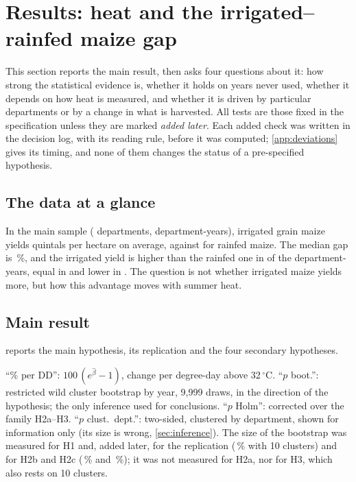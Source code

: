 \section{Results: heat and the irrigated--rainfed maize gap}
\label{sec:maize}

This section reports the main result, then asks four questions about it: how strong the statistical evidence is, whether it holds on years never used, whether it depends on how heat is measured, and whether it is driven by particular departments or by a change in what is harvested. All tests are those fixed in the specification unless they are marked \emph{added later}. Each added check was written in the decision log, with its reading rule, before it was computed; \cref{app:deviations} gives its timing, and none of them changes the status of a pre-specified hypothesis.

\subsection{The data at a glance}

In the main sample (\MaizeMainDeps{} departments, \MaizeMainPairs{} department-years), irrigated grain maize yields \YieldIrr{} quintals per hectare on average, against \YieldRain{} for rainfed maize. The median gap is \GapMedianPct\,\%, and the irrigated yield is higher than the rainfed one in \GapAboveCount{} of the \MaizeMainPairs{} department-years, equal in \GapEqualCount{} and lower in \GapBelowCount. The question is not whether irrigated maize yields more, but how this advantage moves with summer heat.

\subsection{Main result}
\label{subsec:maize-main}

 reports the main hypothesis, its replication and the four secondary hypotheses.

\begin{table}[H]
\centering
\small
\caption{Maize: main and secondary hypotheses (July--August, maize mask)}
\label{tab:maize-hyp}
\begin{threeparttable}
{\setlength{\tabcolsep}{3.5pt}}
\begin{tablenotes}\footnotesize
\item ``\% per DD'': $100\,(e^{\hat\beta}-1)$, change per degree-day above 32\,$^{\circ}$C. ``$p$ boot.'': restricted wild cluster bootstrap by year, 9,999 draws, in the direction of the hypothesis; the only inference used for conclusions. ``$p$ Holm'': corrected over the family H2a--H3. ``$p$ clust.\ dept.'': two-sided, clustered by department, shown for information only (its size is wrong, \cref{sec:inference}). The size of the bootstrap was measured for H1 and, added later, for the replication (\ReplSize\,\% with 10 clusters) and for H2b and H2c (\HtwobSize\,\% and \HtwocSize\,\%); it was not measured for H2a, nor for H3, which also rests on 10 clusters.
\end{tablenotes}
\end{threeparttable}
\end{table}

